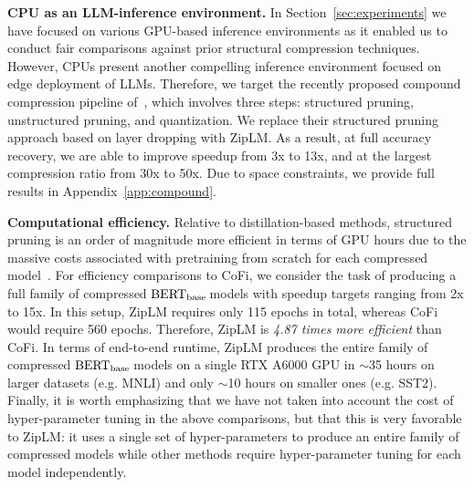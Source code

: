 \documentclass{article}
\newcommand{\bertbase}{$\textrm{BERT}_{\small{\textrm{base}}}\,$}
\newcommand{\ourmethod}{ZipLM}
\theoremstyle{plain}
\theoremstyle{definition}
\theoremstyle{remark}
\renewcommand{\paragraph}[1]{ \noindent \textbf{#1}}
\begin{document}
\paragraph{CPU as an LLM-inference environment.} In Section~\ref{sec:experiments} we have focused on various \mbox{GPU-based} inference environments as it enabled us to conduct fair comparisons against prior structural compression techniques. However, CPUs present another compelling inference environment focused on edge deployment of LLMs. Therefore, we target the recently proposed compound compression pipeline of~\cite{obert}, which involves three steps: structured pruning, unstructured pruning, and quantization. We replace their structured pruning approach based on layer dropping with \ourmethod{}. As a result, at full accuracy recovery, we are able to improve speedup from 3x to 13x, and at the largest compression ratio from 30x to 50x. Due to space constraints, we provide full results in Appendix~\ref{app:compound}.

\paragraph{Computational efficiency.} Relative to distillation-based methods, structured pruning is an order of magnitude more efficient in terms of GPU hours due to the massive costs associated with pretraining from scratch for each compressed model~\cite{xia2022structured, sun2020mobilebert, Jiao2020TinyBERTDB}. For efficiency comparisons to CoFi, we consider the task of producing a full family of compressed \bertbase models with speedup targets ranging from 2x to 15x. In this setup, ZipLM requires only 115 epochs in total, whereas CoFi would require 560 epochs. Therefore, ZipLM is \emph{4.87 times more efficient} than CoFi. In terms of end-to-end runtime, ZipLM produces the entire family of compressed \bertbase models on a single RTX A6000 GPU in $\sim$35 hours on larger datasets (e.g. MNLI) and only $\sim$10 hours on smaller ones (e.g. SST2). Finally, it is worth emphasizing that we have not taken into account the cost of hyper-parameter tuning in the above comparisons, but that this is very favorable to ZipLM: it uses a single set of hyper-parameters to produce an entire family of compressed models while other methods require hyper-parameter tuning for each model independently. 
\end{document}
